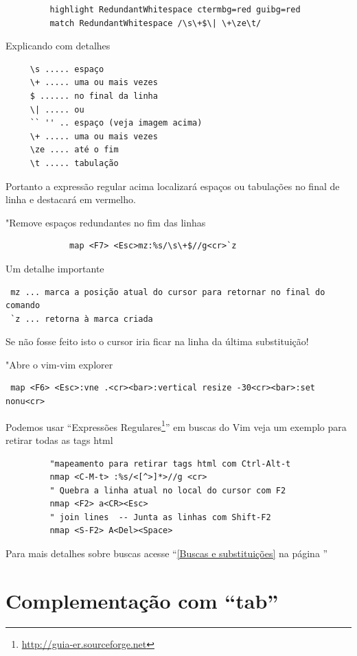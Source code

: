 \documentclass[10pt,a4paper,openany]{book}
\begin{document}
\begin{verbatim}
		 highlight RedundantWhitespace ctermbg=red guibg=red
		 match RedundantWhitespace /\s\+$\| \+\ze\t/
\end{verbatim}

Explicando com detalhes

\begin{verbatim}
	 \s ..... espaço
	 \+ ..... uma ou mais vezes
	 $ ...... no final da linha
	 \| ..... ou
	 `` '' .. espaço (veja imagem acima)
	 \+ ..... uma ou mais vezes
	 \ze .... até o fim
	 \t ..... tabulação
\end{verbatim}

Portanto a expressão regular acima localizará espaços ou tabulações no final de linha
e destacará em vermelho.

"Remove espaços redundantes no fim das linhas

\begin{verbatim}
			 map <F7> <Esc>mz:%s/\s\+$//g<cr>`z
\end{verbatim}

Um detalhe importante

\begin{verbatim}
 mz ... marca a posição atual do cursor para retornar no final do comando
 `z ... retorna à marca criada
\end{verbatim}

Se não fosse feito isto o cursor iria ficar na linha da última substituição!

"Abre o vim-vim explorer

\begin{verbatim}
 map <F6> <Esc>:vne .<cr><bar>:vertical resize -30<cr><bar>:set nonu<cr>
\end{verbatim}

Podemos usar ``Expressões Regulares\footnote{\url{http://guia-er.sourceforge.net}}'' em
buscas do Vim veja um exemplo para retirar todas as tags html

\begin{verbatim}
		 "mapeamento para retirar tags html com Ctrl-Alt-t
		 nmap <C-M-t> :%s/<[^>]*>//g <cr>
		 " Quebra a linha atual no local do cursor com F2
		 nmap <F2> a<CR><Esc>
		 " join lines  -- Junta as linhas com Shift-F2
		 nmap <S-F2> A<Del><Space>
\end{verbatim}

Para mais detalhes sobre buscas acesse ``\ref{Buscas e substituições}
na página \pageref{Buscas e substituições}''

\section{Complementação com ``tab''}\label{Complementação com ``tab''}
\end{document}
